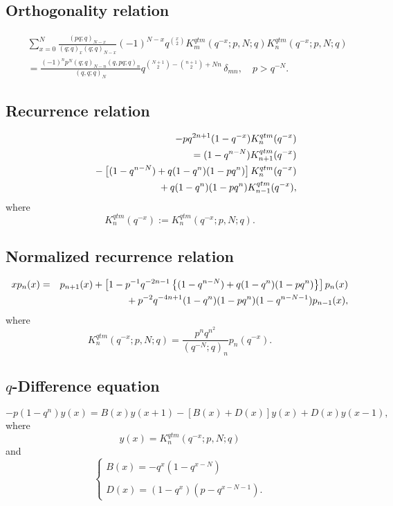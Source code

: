 \documentclass[envcountchap,graybox]{svmono}
\newcommand{\mathindent}{\hspace{7.5mm}}
\begin{document}
\subsection*{Orthogonality relation}
\begin{eqnarray}
\label{OrtQuantumqKrawtchouk}
& &\sum_{x=0}^N\frac{(pq;q)_{N-x}}{(q;q)_x(q;q)_{N-x}}(-1)^{N-x}q^{\binom{x}{2}}
K_m^{qtm}(q^{-x};p,N;q)K_n^{qtm}(q^{-x};p,N;q)\nonumber\\
& &{}=\frac{(-1)^np^N(q;q)_{N-n}(q,pq;q)_n}{(q,q;q)_N}
q^{\binom{N+1}{2}-\binom{n+1}{2}+Nn}\,\delta_{mn},\quad p>q^{-N}.
\end{eqnarray}

\subsection*{Recurrence relation}
\begin{eqnarray}
\label{RecQuantumqKrawtchouk}
& &-pq^{2n+1}(1-q^{-x})K_n^{qtm}(q^{-x})\nonumber\\
& &{}=(1-q^{n-N})K_{n+1}^{qtm}(q^{-x})\nonumber\\
& &{}\mathindent{}-\left[(1-q^{n-N})+q(1-q^n)(1-pq^n)\right]K_n^{qtm}(q^{-x})\nonumber\\
& &{}\mathindent\mathindent{}+q(1-q^n)(1-pq^n)K_{n-1}^{qtm}(q^{-x}),
\end{eqnarray}
where
$$K_n^{qtm}(q^{-x}):=K_n^{qtm}(q^{-x};p,N;q).$$

\subsection*{Normalized recurrence relation}
\begin{eqnarray}
\label{NormRecQuantumqKrawtchouk}
xp_n(x)&=&p_{n+1}(x)+
\left[1-p^{-1}q^{-2n-1}\left\{(1-q^{n-N})+q(1-q^n)(1-pq^n)\right\}\right]p_n(x)\nonumber\\
& &{}\mathindent{}+p^{-2}q^{-4n+1}(1-q^n)(1-pq^n)(1-q^{n-N-1})p_{n-1}(x),
\end{eqnarray}
where
$$K_n^{qtm}(q^{-x};p,N;q)=\frac{p^nq^{n^2}}{(q^{-N};q)_n}p_n(q^{-x}).$$

\subsection*{$q$-Difference equation}
\begin{equation}
\label{dvQuantumqKrawtchouk}
-p(1-q^n)y(x)=B(x)y(x+1)-\left[B(x)+D(x)\right]y(x)+D(x)y(x-1),
\end{equation}
where
$$y(x)=K_n^{qtm}(q^{-x};p,N;q)$$
and
$$\left\{\begin{array}{l}\displaystyle B(x)=-q^x(1-q^{x-N})\\
\\
\displaystyle D(x)=(1-q^x)(p-q^{x-N-1}).\end{array}\right.$$
\end{document}
